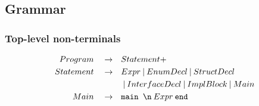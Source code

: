 \documentclass[a4paper, 12pt]{article}
\newcommand{\sepbar}{\: | \:}	%
\newcommand{\substo}{\quad\rightarrow\quad}
\renewcommand{\tt}{\texttt}
\begin{document}



\subsection{Grammar}
\subsubsection{Top-level non-terminals}
\begin{align*}
Program \substo& Statement+\\
Statement \substo& Expr \sepbar EnumDecl \sepbar StructDecl\\
&\sepbar InterfaceDecl \sepbar ImplBlock \sepbar Main\\
Main \substo& \tt{main \symbol{92}n}\: Expr \: \tt{end}
\end{align*}
\end{document}
